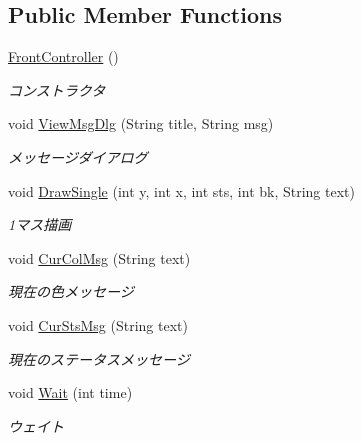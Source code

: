 \subsection*{Public Member Functions}
\begin{DoxyCompactItemize}
\item 
\mbox{\hyperlink{classjp_1_1gr_1_1java__conf_1_1yuta__yoshinaga_1_1reversi_1_1controller_1_1_front_controller_a918d736b7b4d8672076c15f8ca05075c}{Front\+Controller}} ()
\begin{DoxyCompactList}\small\item\em コンストラクタ \end{DoxyCompactList}\item 
void \mbox{\hyperlink{classjp_1_1gr_1_1java__conf_1_1yuta__yoshinaga_1_1reversi_1_1controller_1_1_front_controller_a03f8b3b1b7991cfb075f8708d4041ddb}{View\+Msg\+Dlg}} (String title, String msg)
\begin{DoxyCompactList}\small\item\em メッセージダイアログ \end{DoxyCompactList}\item 
void \mbox{\hyperlink{classjp_1_1gr_1_1java__conf_1_1yuta__yoshinaga_1_1reversi_1_1controller_1_1_front_controller_acf079ebc5949ce36b15c56158c9b9cfa}{Draw\+Single}} (int y, int x, int sts, int bk, String text)
\begin{DoxyCompactList}\small\item\em 1マス描画 \end{DoxyCompactList}\item 
void \mbox{\hyperlink{classjp_1_1gr_1_1java__conf_1_1yuta__yoshinaga_1_1reversi_1_1controller_1_1_front_controller_ac49c44c8bb767770364c52164b699110}{Cur\+Col\+Msg}} (String text)
\begin{DoxyCompactList}\small\item\em 現在の色メッセージ \end{DoxyCompactList}\item 
void \mbox{\hyperlink{classjp_1_1gr_1_1java__conf_1_1yuta__yoshinaga_1_1reversi_1_1controller_1_1_front_controller_a49315230e704778721afb73c59e14d88}{Cur\+Sts\+Msg}} (String text)
\begin{DoxyCompactList}\small\item\em 現在のステータスメッセージ \end{DoxyCompactList}\item 
void \mbox{\hyperlink{classjp_1_1gr_1_1java__conf_1_1yuta__yoshinaga_1_1reversi_1_1controller_1_1_front_controller_af513d1ccfca9fc00f93fb650f1f08b05}{Wait}} (int time)
\begin{DoxyCompactList}\small\item\em ウェイト \end{DoxyCompactList}\end{DoxyCompactItemize}
